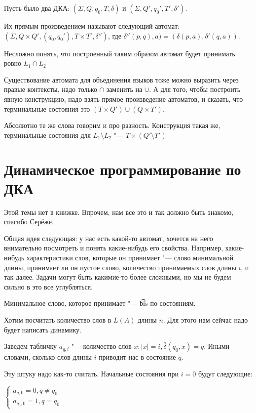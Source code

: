 \begin{Def}
Пусть было два ДКА: $(\Sigma, Q, q_0, T, \delta)$ и $(\Sigma, Q', q_0', T', \delta')$.

Их прямым произведением называют следующий автомат: $(\Sigma, Q \times Q', (q_0, q_0'), T \times T', \delta'')$, где $\delta''(p, q), a) = (\delta(p, a), \delta'(q, a))$.
\end{Def}
Несложно понять, что построенный таким образом автомат будет принимать ровно $L_1 \cap L_2$

Существование автомата для объединения языков тоже можно выразить через правые контексты, надо только $\cap$ заменить на $\cup$. 
А для того, чтобы построить явную конструкцию, надо взять прямое произведение автоматов, и сказать, что терминальные состояния это $(T \times Q') \cup (Q \times T')$.


Абсолютно те же слова говорим и про разность.
Конструкция такая же, терминальные состояния для $L_1 \setminus L_2$ "--- $T \times (Q' \setminus T')$


\section{Динамическое программирование по ДКА}
\begin{Rem}
Этой темы нет в книжке. Впрочем, нам все это и так должно быть знакомо, спасибо Серёже.
\end{Rem}

Общая идея следующая: у нас есть какой-то автомат, хочется на него внимательно посмотреть и понять какие-нибудь его свойства. 
Например, какие-нибудь характеристики слов, которые он принимает "--- слово минимальной длины, принимает ли он пустое слово, количество принимаемых слов длины $i$, и так далее.
Задачи могут быть какимие-то более сложными, но мы не будем сильно в это все углубляться.


Минимальное слово, которое принимает "--- \t{bfs} по состояниям.

Хотим посчитать количество слов в $L(A)$ длины $n$. Для этого нам сейчас надо будет написать динамику. 

Заведем табличку $a_{q, i}$ "--- количество слов $x: |x| = i, \hat \delta(q_0, x) = q$. 
Иными словами, сколько слов длины $i$ приводит нас в состояние $q$.

Эту штуку надо как-то считать. Начальные состояния при $i=0$ будут следующие:

$
    \begin{cases}
        a_{q, 0} = 0, q \neq q_0 \\
        a_{q_0, 0} = 1, q = q_0
    \end{cases} 
$

